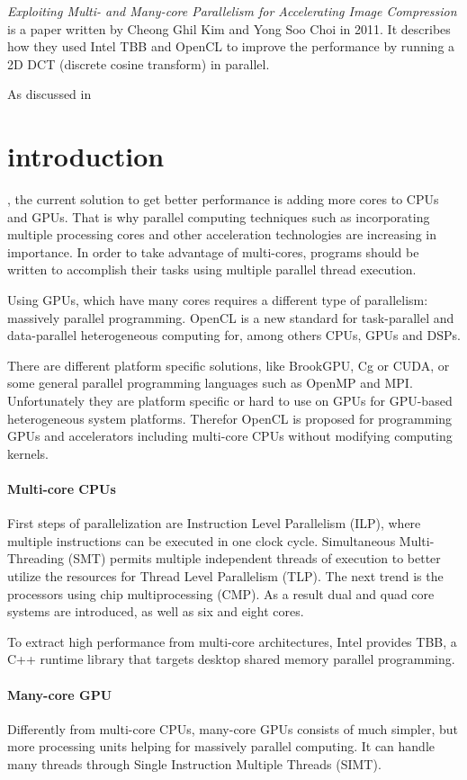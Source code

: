 \emph{Exploiting Multi- and Many-core Parallelism for Accelerating Image
Compression} \cite{KimExploitingMultiManyCore} is a paper written by Cheong
Ghil Kim and Yong Soo Choi in 2011. It describes how they used Intel TBB and
OpenCL to improve the performance by running a 2D DCT (discrete cosine
transform) in parallel.

As discussed in \section{introduction}, the current solution to get better
performance is adding more cores to CPUs and GPUs. That is why parallel
computing techniques such as incorporating multiple processing cores and other
acceleration technologies are increasing in importance. In order to take
advantage of multi-cores, programs should be written to accomplish their tasks
using multiple parallel thread execution.

Using GPUs, which have many cores requires a different type of parallelism:
massively parallel programming. OpenCL is a new standard for task-parallel and
data-parallel heterogeneous computing for, among others CPUs, GPUs and DSPs.

There are different platform specific solutions, like BrookGPU, Cg or CUDA, or
some general parallel programming languages such as OpenMP and MPI\@.
Unfortunately they are platform specific or hard to use on GPUs for GPU-based
heterogeneous system platforms. Therefor OpenCL is proposed for programming
GPUs and accelerators including multi-core CPUs without modifying computing
kernels.

\paragraph{Multi-core CPUs}

First steps of parallelization are Instruction Level Parallelism (ILP), where
multiple instructions can be executed in one clock cycle. Simultaneous
Multi-Threading (SMT) permits multiple independent threads of execution to
better utilize the resources for Thread Level Parallelism (TLP). The next trend
is the processors using chip multiprocessing (CMP). As a result dual and quad
core systems are introduced, as well as six and eight cores.

To extract high performance from multi-core architectures, Intel provides TBB,
a C++ runtime library that targets desktop shared memory parallel programming.

\paragraph{Many-core GPU} Differently from multi-core CPUs, many-core GPUs
consists of much simpler, but more processing units helping for massively
parallel computing. It can handle many threads through Single Instruction
Multiple Threads (SIMT).

